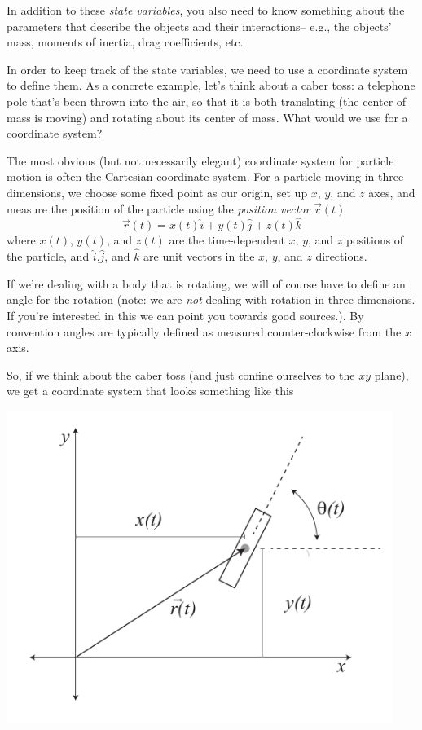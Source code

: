 \documentclass{tufte-handout}
\begin{document}
In addition to these {\it state variables}, you also need to know something about the parameters that describe the objects and their interactions-- e.g., the objects' mass,  moments of inertia, drag coefficients, etc.

In order to keep track of the state variables, we need to use a coordinate system to define them.  As a concrete example, let's think about a caber toss: a telephone pole that's been thrown into the air, so that it is both translating (the center of mass is moving) and rotating about its center of mass.  What would we use for a coordinate system?

The most obvious (but not necessarily elegant) coordinate system for particle motion is often the Cartesian coordinate system.  For a particle moving in three dimensions, we choose some fixed point as our origin, set up $x$, $y$, and $z$ axes, and measure the position of the particle using the {\it position vector} $\vec{r}(t)$
$$\vec{r}(t) = x(t) \hat{i} + y(t) \hat{j} + z(t) \hat{k}$$
where $x(t)$, $y(t)$, and $z(t)$ are the time-dependent $x$, $y$, and $z$ positions of the particle, and $\hat{i}$,$\hat{j}$, and $\hat{k}$ are unit vectors in the  $x$, $y$, and $z$ directions.  


If we're dealing with a body that is rotating, we will of course have to define an angle for the rotation (note: we are {\it not} dealing with rotation in three dimensions.  If you're interested in this we can point you towards good sources.).  By convention angles are typically defined as measured counter-clockwise from the $x$ axis.

So, if we think about the caber toss (and just confine ourselves to the $xy$ plane), we get a coordinate system that looks something like this


\includegraphics[height=4in]{figs/ExampleCoordSystem}
\end{document}

